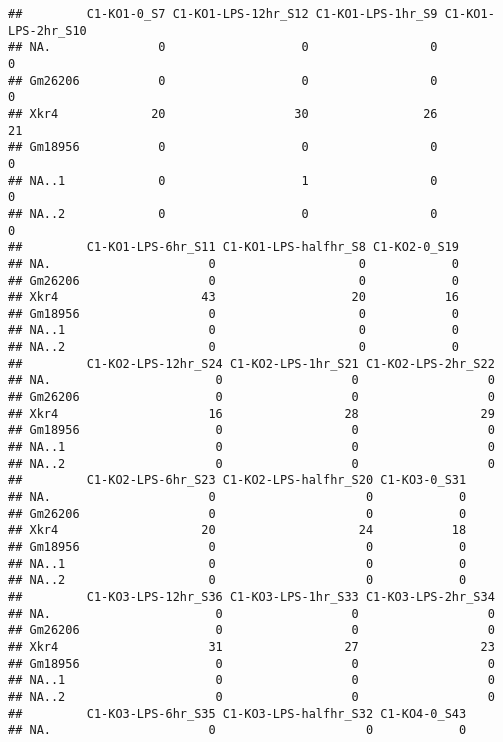 \documentclass[
]{article}
\begin{document}
\begin{verbatim}
##         C1-KO1-0_S7 C1-KO1-LPS-12hr_S12 C1-KO1-LPS-1hr_S9 C1-KO1-LPS-2hr_S10
## NA.               0                   0                 0                  0
## Gm26206           0                   0                 0                  0
## Xkr4             20                  30                26                 21
## Gm18956           0                   0                 0                  0
## NA..1             0                   1                 0                  0
## NA..2             0                   0                 0                  0
##         C1-KO1-LPS-6hr_S11 C1-KO1-LPS-halfhr_S8 C1-KO2-0_S19
## NA.                      0                    0            0
## Gm26206                  0                    0            0
## Xkr4                    43                   20           16
## Gm18956                  0                    0            0
## NA..1                    0                    0            0
## NA..2                    0                    0            0
##         C1-KO2-LPS-12hr_S24 C1-KO2-LPS-1hr_S21 C1-KO2-LPS-2hr_S22
## NA.                       0                  0                  0
## Gm26206                   0                  0                  0
## Xkr4                     16                 28                 29
## Gm18956                   0                  0                  0
## NA..1                     0                  0                  0
## NA..2                     0                  0                  0
##         C1-KO2-LPS-6hr_S23 C1-KO2-LPS-halfhr_S20 C1-KO3-0_S31
## NA.                      0                     0            0
## Gm26206                  0                     0            0
## Xkr4                    20                    24           18
## Gm18956                  0                     0            0
## NA..1                    0                     0            0
## NA..2                    0                     0            0
##         C1-KO3-LPS-12hr_S36 C1-KO3-LPS-1hr_S33 C1-KO3-LPS-2hr_S34
## NA.                       0                  0                  0
## Gm26206                   0                  0                  0
## Xkr4                     31                 27                 23
## Gm18956                   0                  0                  0
## NA..1                     0                  0                  0
## NA..2                     0                  0                  0
##         C1-KO3-LPS-6hr_S35 C1-KO3-LPS-halfhr_S32 C1-KO4-0_S43
## NA.                      0                     0            0

\end{verbatim}
\end{document}
